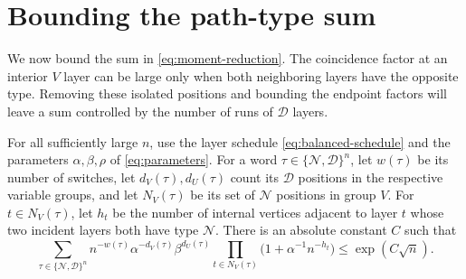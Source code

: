 \section{Bounding the path-type sum}
\label{sec:path-sum}

We now bound the sum in \eqref{eq:moment-reduction}. The coincidence factor
at an interior $V$ layer can be large only when both neighboring layers
have the opposite type. Removing these isolated positions and bounding the
endpoint factors will leave a sum controlled by the number of runs of
$\mathcal D$ layers.

\begin{lemma}\label{lem:word-sum}
For all sufficiently large $n$, use the layer schedule
\eqref{eq:balanced-schedule} and the parameters $\alpha,\beta,\rho$ of
\eqref{eq:parameters}. For a word
$\tau\in\{\mathcal N,\mathcal D\}^n$, let $w(\tau)$ be its number of
switches, let $d_V(\tau),d_U(\tau)$ count its $\mathcal D$ positions in
the respective variable groups, and let $N_V(\tau)$ be its set of
$\mathcal N$ positions in group $V$. For $t\in N_V(\tau)$, let $h_t$ be
the number of internal vertices adjacent to layer $t$ whose two incident
layers both have type $\mathcal N$. There is an absolute constant $C$ such
that
\begin{equation}\label{eq:word-sum}
 \sum_{\tau\in\{\mathcal N,\mathcal D\}^n}
 n^{-w(\tau)}\alpha^{-d_V(\tau)}\beta^{d_U(\tau)}
 \prod_{t\in N_V(\tau)}\bigl(1+\alpha^{-1}n^{-h_t}\bigr)
 \le \exp(C\sqrt n).
\end{equation}
\end{lemma}

